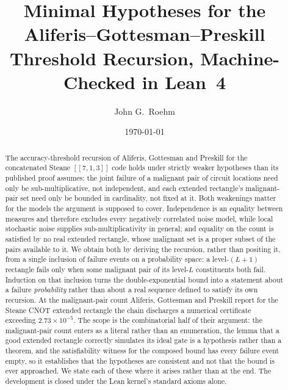 \documentclass[aps,prx,reprint,nofootinbib,superscriptaddress]{revtex4-2}
\begin{document}
\title{Minimal Hypotheses for the Aliferis--Gottesman--Preskill
Threshold Recursion, Machine-Checked in Lean~4}

\author{John G.\ Roehm}

\date{\today}

\begin{abstract}
The accuracy-threshold recursion of Aliferis, Gottesman and Preskill for the
concatenated Steane $[[7,1,3]]$ code holds under strictly weaker hypotheses than
its published proof assumes: the joint failure of a malignant pair of circuit
locations need only be sub-multiplicative, not independent, and each extended
rectangle's malignant-pair set need only be bounded in cardinality, not fixed at
it. Both weakenings matter for the models the argument is supposed to cover.
Independence is an equality between measures and therefore excludes every
negatively correlated noise model, while local stochastic noise supplies
sub-multiplicativity in general; and equality on the count is satisfied by no
real extended rectangle, whose malignant set is a proper subset of the pairs
available to it. We obtain both by deriving the recursion, rather than positing
it, from a single inclusion of failure events on a probability space: a
level-$(L{+}1)$ rectangle fails only when some malignant pair of its level-$L$
constituents both fail. Induction on that inclusion turns the
double-exponential bound into a statement about a failure \emph{probability}
rather than about a real sequence defined to satisfy its own recursion. At the
malignant-pair count Aliferis, Gottesman and Preskill report for the Steane CNOT
extended rectangle the chain discharges a numerical certificate exceeding
$2.73 \times 10^{-5}$. The scope is the combinatorial half of their argument:
the malignant-pair count enters as a literal rather than an enumeration, the
lemma that a good extended rectangle correctly simulates its ideal gate is a
hypothesis rather than a theorem, and the satisfiability witness for the
composed bound has every failure event empty, so it establishes that the
hypotheses are consistent and not that the bound is ever approached. We state
each of these where it arises rather than at the end. The development is closed
under the Lean kernel's standard axioms alone.
\end{abstract}

\maketitle
\end{document}
